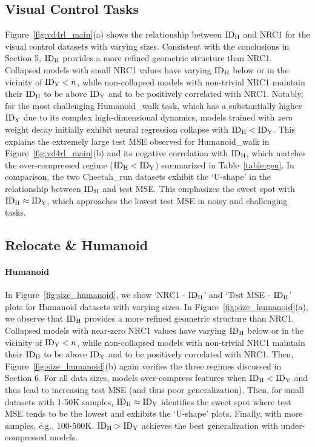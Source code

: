 \subsection{Visual Control Tasks} 
Figure~\ref{fig:vd4rl_main}(a) shows the relationship between $\mathrm{ID}_{\mathrm{H}}$ and NRC1 for the visual control datasets with varying sizes. Consistent with the conclusions in Section 5, $\mathrm{ID}_{\mathrm{H}}$ provides a more refined geometric structure than NRC1. Collapsed models with small NRC1 values have varying $\mathrm{ID}_{\mathrm{H}}$ below or in the vicinity of $\mathrm{ID}_{\mathrm{Y}} < n$, while non-collapsed models with non-trivial NRC1 maintain their $\mathrm{ID}_{\mathrm{H}}$ to be above $\mathrm{ID}_{\mathrm{Y}}$ and to be positively correlated with NRC1. Notably, for the most challenging Humanoid\_walk task, which has a substantially higher $\mathrm{ID}_{\mathrm{Y}}$ due to its complex high-dimensional dynamics, models trained with \emph{zero} weight decay initially exhibit neural regression collapse with $\mathrm{ID}_{\mathrm{H}} < \mathrm{ID}_{\mathrm{Y}}$. This explains the extremely large test MSE observed for Humanoid\_walk in Figure~\ref{fig:vd4rl_main}(b) and its negative correlation with $\mathrm{ID}_{\mathrm{H}}$, which matches the over-compressed regime ($\mathrm{ID}_{\mathrm{H}} < \mathrm{ID}_{\mathrm{Y}}$) summarized in Table~\ref{table:gen}. In comparison, the two Cheetah\_run datasets exhibit the `U-shape' in the relationship between $\mathrm{ID}_{\mathrm{H}}$ and test MSE. This emphasizes the sweet spot with $\mathrm{ID}_{\mathrm{H}} \approx \mathrm{ID}_{\mathrm{Y}}$, which approaches the lowest test MSE in noisy and challenging tasks.

\subsection{Relocate \& Humanoid}
\paragraph{Humanoid} In Figure~\ref{fig:size_humanoid}, we show `NRC1 - $\mathrm{ID}_{\mathrm{H}}$' and `Test MSE - $\mathrm{ID}_{\mathrm{H}}$' plots for Humanoid datasets with varying sizes. In Figure~\ref{fig:size_humanoid}(a), we observe that $\mathrm{ID}_{\mathrm{H}}$ provides a more refined geometric structure than NRC1. Collapsed models with near-zero NRC1 values have varying $\mathrm{ID}_{\mathrm{H}}$ below or in the vicinity of $\mathrm{ID}_{\mathrm{Y}} < n$, while non-collapsed models with non-trivial NRC1 maintain their $\mathrm{ID}_{\mathrm{H}}$ to be above $\mathrm{ID}_{\mathrm{Y}}$ and to be positively correlated with NRC1. Then, Figure~\ref{fig:size_humanoid}(b) again verifies the three regimes discussed in Section 6. For all data sizes, models over-compress features when $\mathrm{ID}_{\mathrm{H}} < \mathrm{ID}_{\mathrm{Y}}$ and thus lead to increasing test MSE (and thus poor generalization). Then, for small datasets with 1-50K samples, $\mathrm{ID}_{\mathrm{H}} \approx \mathrm{ID}_{\mathrm{Y}}$ identifies the sweet spot where test MSE tends to be the lowest and exhibits the `U-shape' plots. Finally, with more samples, e.g., 100-500K, $\mathrm{ID}_{\mathrm{H}} > \mathrm{ID}_{\mathrm{Y}}$ achieves the best generalization with under-compressed models. 

